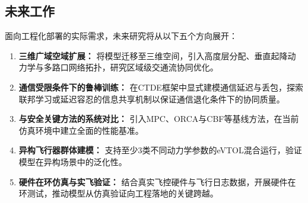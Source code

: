 \documentclass[12pt,a4paper,UTF8]{ctexart}
\begin{document}
\subsection{未来工作}

面向工程化部署的实际需求，未来研究将从以下五个方向展开：

\begin{enumerate}[label=(\arabic*)]
    \item \textbf{三维广域空域扩展：} 将模型迁移至三维空间，引入高度层分配、垂直起降动力学与多路口网络拓扑，研究区域级交通流协同优化。
    \item \textbf{通信受限条件下的鲁棒训练：} 在CTDE框架中显式建模通信延迟与丢包，探索联邦学习或延迟容忍的信息共享机制以保证通信退化条件下的协同质量。
    \item \textbf{与安全关键方法的系统对比：} 引入MPC、ORCA与CBF等基线方法，在当前仿真环境中建立全面的性能基准。
    \item \textbf{异构飞行器群体建模：} 支持至少3类不同动力学参数的eVTOL混合运行，验证模型在异构场景中的泛化性。
    \item \textbf{硬件在环仿真与实飞验证：} 结合真实飞控硬件与飞行日志数据，开展硬件在环测试，推动模型从仿真验证向工程落地的关键跨越。
\end{enumerate}
\end{document}
